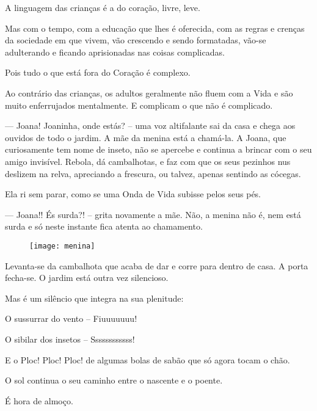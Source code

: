 A linguagem das crianças é a do coração, livre, leve.

Mas com o tempo, com a educação que lhes é oferecida, com as regras e crenças da sociedade em que vivem, vão crescendo e sendo formatadas, vão-se adulterando e ficando aprisionadas nas coisas complicadas.

Pois tudo o que está fora do Coração é complexo.

Ao contrário das crianças, os adultos geralmente não fluem com a Vida e são muito enferrujados mentalmente. E complicam o que não é complicado.

— Joana! Joaninha, onde estás? – uma voz altifalante sai da casa e chega aos ouvidos de todo o jardim. A mãe da menina está a chamá-la.
\bigbreak
A Joana, que curiosamente tem nome de inseto, não se apercebe e continua a brincar com o seu amigo invisível. Rebola, dá cambalhotas, e faz com que os seus pezinhos nus deslizem na relva, apreciando a frescura, ou talvez, apenas sentindo as cócegas.

Ela ri sem parar, como se uma Onda de Vida subisse pelos seus pés.

— Joana!! És surda?! – grita novamente a mãe.
\bigbreak
Não, a menina não é, nem está surda e só neste instante fica atenta ao chamamento.

\begin{figure}[h]
    \centering
    \texttt{[image: menina]}
\end{figure}

Levanta-se da cambalhota que acaba de dar e corre para dentro de casa. A porta fecha-se.
\bigbreak
O jardim está outra vez silencioso.

Mas é um silêncio que integra na sua plenitude:

O sussurrar do vento – Fiuuuuuuu!

O sibilar dos insetos – Ssssssssssss!

E o Ploc! Ploc! Ploc! de algumas bolas de sabão que só agora tocam o chão.

O sol continua o seu caminho entre o nascente e o poente.

É hora de almoço.
